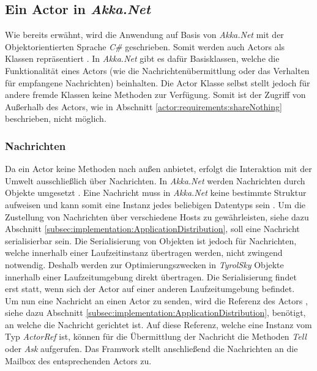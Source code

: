 \subsection{Ein Actor in \textit{Akka.Net}}
Wie bereits erwähnt, wird die Anwendung auf Basis von \textit{Akka.Net} mit der Objektorientierten Sprache \textit{C\#} geschrieben. Somit werden auch Actors als Klassen repräsentiert \citep{Akka.netCommunityAkka.NETDocumentation}. In \textit{Akka.Net} gibt es dafür Basisklassen, welche die Funktionalität eines Actors (wie die Nachrichtenübermittlung oder das Verhalten für empfangene Nachrichten) beinhalten. Die Actor Klasse selbst stellt jedoch für andere fremde Klassen keine Methoden zur Verfügung. Somit ist der Zugriff von Außerhalb des Actors, wie in Abschnitt \ref{actor:requirements:shareNothing} beschrieben, nicht möglich. 

\subsubsection{Nachrichten}\label{subsec:implementation:akkaMessaging}
Da ein Actor keine Methoden nach außen anbietet, erfolgt die Interaktion mit der Umwelt ausschließlich über Nachrichten. In \textit{Akka.Net} werden Nachrichten durch Objekte umgesetzt \citep{akkaInAction}. Eine Nachricht muss in \textit{Akka.Net} keine bestimmte Struktur aufweisen und kann somit eine Instanz jedes beliebigen Datentyps sein \citep{akkaInAction}. Um die Zustellung von Nachrichten über verschiedene Hosts zu gewährleisten, siehe dazu Abschnitt \ref{subsec:implementation:ApplicationDistribution}, soll eine Nachricht serialisierbar sein. Die Serialisierung von Objekten ist jedoch für Nachrichten, welche innerhalb einer Laufzeitinstanz übertragen werden, nicht zwingend notwendig. Deshalb werden zur Optimierungszwecken in \textit{TyrolSky} Objekte innerhalb einer Laufzeitumgebung direkt übertragen. Die Serialisierung findet erst statt, wenn sich der Actor auf einer anderen Laufzeitumgebung befindet. \\
Um nun eine Nachricht an einen Actor zu senden, wird die Referenz des Actors , siehe dazu Abschnitt \ref{subsec:implementation:ApplicationDistribution}, benötigt, an welche die Nachricht gerichtet ist. Auf diese Referenz, welche eine Instanz vom Typ \textit{ActorRef} ist, können für die Übermittlung der Nachricht die Methoden \textit{Tell} oder \textit{Ask} aufgerufen. Das Framwork stellt anschließend die Nachrichten an die Mailbox des entsprechenden Actors zu.

